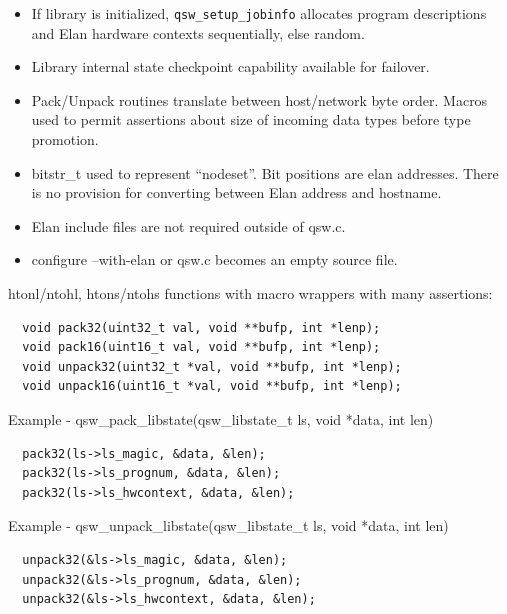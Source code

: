 \documentclass[letter,landscape]{seminar}
\begin{document}
\begin{slide}
  \small
  \begin{itemize}
  \item If library is initialized, {\tt qsw\_setup\_jobinfo} allocates
  program descriptions and Elan hardware contexts sequentially, else random.
  \item Library internal state checkpoint capability available for failover.
  \item Pack/Unpack routines translate between host/network byte order.
  Macros used to permit assertions about size of incoming data types before
  type promotion.
  \item bitstr\_t used to represent ``nodeset''.  Bit positions are elan 
  addresses.  There is no provision for converting between Elan address and
  hostname.
  \item Elan include files are not required outside of qsw.c.
  \item configure --with-elan or qsw.c becomes an empty source file.
  \end{itemize}
\end{slide}

\begin{slide}
  \tiny
  htonl/ntohl, htons/ntohs functions with macro wrappers with many assertions:
  \begin{verbatim}
  void pack32(uint32_t val, void **bufp, int *lenp);
  void pack16(uint16_t val, void **bufp, int *lenp);
  void unpack32(uint32_t *val, void **bufp, int *lenp);
  void unpack16(uint16_t *val, void **bufp, int *lenp);
  \end{verbatim}
  Example - qsw\_pack\_libstate(qsw\_libstate\_t ls, void *data, int len)
  \begin{verbatim}
  pack32(ls->ls_magic, &data, &len);
  pack32(ls->ls_prognum, &data, &len);
  pack32(ls->ls_hwcontext, &data, &len);
  \end{verbatim}
  Example - qsw\_unpack\_libstate(qsw\_libstate\_t ls, void *data, int len)
  \begin{verbatim}
  unpack32(&ls->ls_magic, &data, &len);
  unpack32(&ls->ls_prognum, &data, &len);
  unpack32(&ls->ls_hwcontext, &data, &len);
  \end{verbatim}
\end{slide}
 
\end{document}
